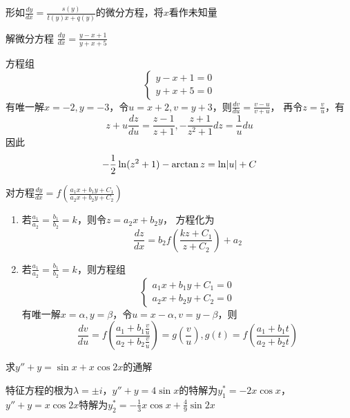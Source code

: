 \documentclass{article}
\begin{document}
\begin{remark}
形如\(\frac{dy}{dx}=\frac{s(y)}{t(y)x+q(y)}\)的微分方程，将\(x\)看作未知量
\end{remark}

\begin{examplle}[]
解微分方程
\(\displaystyle\frac{dy}{dx}=\frac{y-x+1}{y+x+5}\)

方程组
\begin{equation*}
\begin{cases}
y-x+1=0\\
y+x+5=0
\end{cases}
\end{equation*}
有唯一解\(x=-2,y=-3\)，令\(u=x+2,v=y+3\)，则\(\frac{dv}{du}=\frac{v-u}{v+u}\)，
再令\(z=\frac{v}{u}\)，有
\begin{equation*}
z+u\frac{dz}{du}=\frac{z-1}{z+1},-\frac{z+1}{z^2+1}dz=\frac{1}{u}du
\end{equation*}
因此
\begin{equation*}
-\frac{1}{2}\ln(z^2+1)-\arctan z=\ln\abs{u}+C
\end{equation*}
\end{examplle}

\begin{remark}
对方程\(\displaystyle\frac{dy}{dx}=f\left(\frac{a_1x+b_1y+C_1}{a_2x+b_2y+C_2}\right)\)
\begin{enumerate}
\item 若\(\displaystyle\frac{a_1}{a_2}=\frac{b_1}{b_2}=k\)，则令\(z=a_2x+b_2y\)，
方程化为
\begin{equation*}
\frac{dz}{dx}=b_2f\left(\frac{kz+C_1}{z+C_2}\right)+a_2
\end{equation*}
\item 若\(\displaystyle\frac{a_1}{a_2}=\frac{b_1}{b_2}=k\)，则方程组
\begin{equation*}
\begin{cases}
a_1x+b_1y+C_1=0\\
a_2x+b_2y+C_2=0
\end{cases}
\end{equation*}
有唯一解\(x=\alpha,y=\beta\)，令\(u=x-\alpha,v=y-\beta\)，则
\begin{equation*}
\frac{dv}{du}=
f\left(
\frac{a_1+b_1\frac{v}{u}}{a_2+b_2\frac{v}{u}}\right)=
g\left(\frac{v}{u}\right),g(t)=f\left(\frac{a_1+b_1t}{a_2+b_2t}\right)
\end{equation*}
\end{enumerate}
\end{remark}

\begin{examplle}[]
求\(y''+y=\sin x+x\cos 2x\)的通解

特征方程的根为\(\lambda=\pm i\)，\(y''+y=4\sin x\)的特解为\(y_1^*=-2x\cos x\)，
\(y''+y=x\cos 2x\)特解为\(y_2^*=-\frac{1}{3}x\cos x +\frac{4}{9}\sin 2x\)
\end{examplle}
\end{document}
